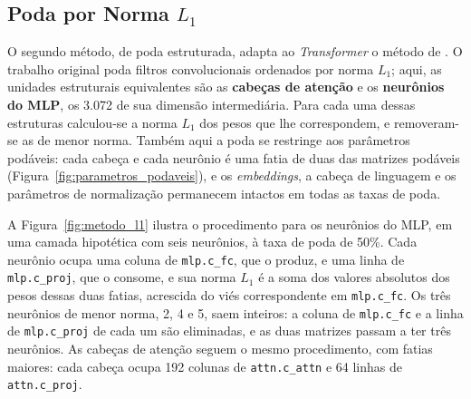 \subsection{Poda por Norma $L_1$}\label{subsec:metodo_estruturado}

O segundo método, de poda estruturada, adapta ao \textit{Transformer} o método de
. O trabalho original poda filtros convolucionais ordenados por norma
$L_1$; aqui, as unidades estruturais equivalentes são as \textbf{cabeças de atenção} e os
\textbf{neurônios do MLP}, os 3.072 de sua dimensão intermediária. Para cada uma dessas
estruturas calculou-se a norma $L_1$ dos pesos que lhe correspondem, e removeram-se as de
menor norma. Também aqui a poda se restringe aos parâmetros podáveis:
cada cabeça e cada neurônio é uma fatia de duas
das matrizes podáveis (Figura~\ref{fig:parametros_podaveis}), e os \textit{embeddings}, a
cabeça de linguagem e os parâmetros de normalização permanecem intactos em todas as taxas
de poda.

A Figura~\ref{fig:metodo_l1} ilustra o procedimento para os neurônios do MLP, em uma camada
hipotética com seis neurônios, à taxa de poda de 50\%. Cada neurônio ocupa uma coluna de
\texttt{mlp.c\_fc}, que o produz, e uma linha de \texttt{mlp.c\_proj}, que o consome, e sua
norma $L_1$ é a soma dos valores absolutos dos pesos dessas duas fatias, acrescida do viés
correspondente em \texttt{mlp.c\_fc}. Os três neurônios de menor norma, 2, 4 e 5, saem
inteiros: a coluna de \texttt{mlp.c\_fc} e a linha de \texttt{mlp.c\_proj} de cada um são
eliminadas, e as duas matrizes passam a ter três neurônios. As cabeças de atenção seguem o
mesmo procedimento, com fatias maiores: cada cabeça ocupa 192 colunas de
\texttt{attn.c\_attn} e 64 linhas de \texttt{attn.c\_proj}.

